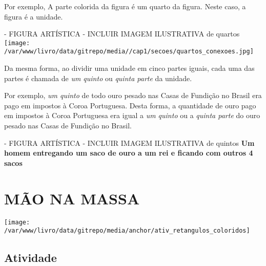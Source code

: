\documentclass[a4paper,12pt,twoside]{book}
\begin{document}
Por exemplo,
A parte colorida da figura é um quarto da figura. Neste caso, a figura é a unidade.


\begin{imagem*}[breakable]{}{}   - FIGURA ARTÍSTICA - INCLUIR IMAGEM ILUSTRATIVA de quartos  
    \texttt{[image: /var/www/livro/data/gitrepo/media//cap1/secoes/quartos\_conexoes.jpg]}  
   \end{imagem*}

Da mesma forma, ao dividir uma unidade em cinco partes iguais, cada uma das partes é chamada de {\it um quinto} ou {\it quinta parte} da unidade.

Por exemplo,
{\it um quinto} de todo ouro pesado nas Casas de Fundição no Brasil era pago em impostos à Coroa Portuguesa. Desta forma, a quantidade de ouro pago em impostos à Coroa Portuguesa era igual a {\it um quinto} ou a {\it quinta parte} do ouro pesado nas Casas de Fundição no Brasil.

\begin{imagem*}[breakable]{}{}   - FIGURA ARTÍSTICA - INCLUIR IMAGEM ILUSTRATIVA de quintos   
  {\bf Um homem entregando um saco de ouro a um rei e ficando com outros 4 sacos}  
\end{imagem*}









\chapter{ MÃO NA MASSA }


\texttt{[image: /var/www/livro/data/gitrepo/media/anchor/ativ\_retangulos\_coloridos]}
\section{Atividade}
\end{document}

